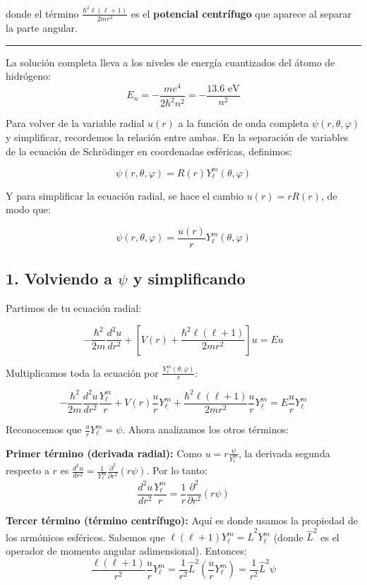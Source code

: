 \documentclass[a4paper]{article}
\begin{document}
donde el término $\frac{\hbar^2\ell(\ell+1)}{2mr^2}$ es el \textbf{potencial centrífugo} que aparece al separar la parte angular.

\bigskip\hrule\bigskip

La solución completa lleva a los niveles de energía cuantizados del átomo de hidrógeno:
\[
E_n = -\frac{me^4}{2\hbar^2 n^2} = -\frac{13.6 \text{ eV}}{n^2}
\]

Para volver de la variable radial $u(r)$ a la función de onda completa $\psi(r, \theta, \varphi)$ y simplificar, recordemos la relación entre ambas. En la separación de variables de la ecuación de Schrödinger en coordenadas esféricas, definimos:

\[
 \psi(r, \theta, \varphi) = R(r) Y_\ell^m(\theta, \varphi) 
\]

Y para simplificar la ecuación radial, se hace el cambio $u(r) = r R(r)$, de modo que:

\[
 \psi(r, \theta, \varphi) = \frac{u(r)}{r} Y_\ell^m(\theta, \varphi) 
\]

\subsection[1. Volviendo a psi y simplificando]{1. Volviendo a $\psi$ y simplificando}

Partimos de tu ecuación radial:

\[
 -\frac{\hbar^2}{2m}\frac{d^2u}{dr^2} + \left[V(r) + \frac{\hbar^2\ell(\ell+1)}{2mr^2}\right]u = Eu 
\]

Multiplicamos toda la ecuación por $\frac{Y_\ell^m(\theta, \varphi)}{r}$:

\[
 -\frac{\hbar^2}{2m} \frac{d^2u}{dr^2} \frac{Y_\ell^m}{r} + V(r) \frac{u}{r} Y_\ell^m + \frac{\hbar^2\ell(\ell+1)}{2mr^2} \frac{u}{r} Y_\ell^m = E \frac{u}{r} Y_\ell^m 
\]

Reconocemos que $\frac{u}{r} Y_\ell^m = \psi$. Ahora analizamos los otros términos:

\textbf{Primer término (derivada radial):}
Como $u = r \frac{\psi}{Y_\ell^m}$, la derivada segunda respecto a $r$ es $\frac{d^2u}{dr^2} = \frac{1}{Y_\ell^m} \frac{\partial^2}{\partial r^2}(r\psi)$. Por lo tanto:
\[
 \frac{d^2u}{dr^2} \frac{Y_\ell^m}{r} = \frac{1}{r} \frac{\partial^2}{\partial r^2}(r\psi) 
\]

\textbf{Tercer término (término centrífugo):}
Aquí es donde usamos la propiedad de los armónicos esféricos. Sabemos que $\ell(\ell+1) Y_\ell^m = \hat{L}^2 Y_\ell^m$ (donde $\hat{L}^2$ es el operador de momento angular adimensional). Entonces:
\[
 \frac{\ell(\ell+1)}{r^2} \frac{u}{r} Y_\ell^m = \frac{1}{r^2} \hat{L}^2 \left( \frac{u}{r} Y_\ell^m \right) = \frac{1}{r^2} \hat{L}^2 \psi 
\]
\end{document}
